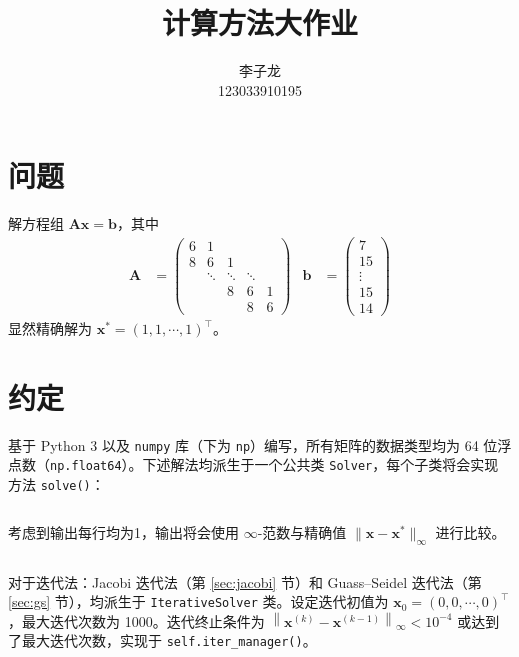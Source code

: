 \documentclass{sjtuarticle}
\title{计算方法大作业}
\author{李子龙\\ 123033910195}
\begin{document}
\maketitle
\tableofcontents
\section{问题}
解方程组 $\bm{A}\bm{x}=\bm{b}$，其中
\begin{align*}
    \bm{A}&=\begin{pmatrix}
        6 & 1 \\
        8 & 6 & 1 \\
          & \ddots & \ddots & \ddots \\
          &        & 8 & 6 & 1 \\
          &        &   & 8 & 6
    \end{pmatrix} & \bm{b}&=\begin{pmatrix}
        7 \\ 15 \\ \vdots \\ 15 \\ 14
    \end{pmatrix}
\end{align*}
显然精确解为 $\bm{x}^*=(1,1,\cdots, 1)^\top$。

\section{约定}

基于 Python 3 以及 \verb"numpy" 库（下为 \verb"np"）编写，所有矩阵的数据类型均为 64 位浮点数（\verb"np.float64"）。下述解法均派生于一个公共类 \verb"Solver"，每个子类将会实现方法 \verb"solve()"：

\inputminted[firstline=4,lastline=21,fontsize=\scriptsize]{python3}{main.py}

考虑到输出每行均为1，输出将会使用 $\infty$-范数与精确值 $\lVert \bm{x}-\bm{x}^* \rVert_\infty$ 进行比较。

\inputminted[firstline=214,lastline=224,fontsize=\scriptsize]{python3}{main.py}

对于迭代法：Jacobi 迭代法（第 \ref{sec:jacobi} 节）和 Guass--Seidel 迭代法（第 \ref{sec:gs} 节），均派生于 \verb"IterativeSolver" 类。设定迭代初值为 $\bm{x}_0=(0,0,\cdots,0)^\top$，最大迭代次数为 1000。迭代终止条件为 $\left\lVert \bm{x}^{(k)}-\bm{x}^{(k-1)}\right\rVert_\infty < 10^{-4}$ 或达到了最大迭代次数，实现于 \verb"self.iter_manager()"。

\inputminted[firstline=137,lastline=155,fontsize=\scriptsize]{python3}{main.py}
\end{document}
